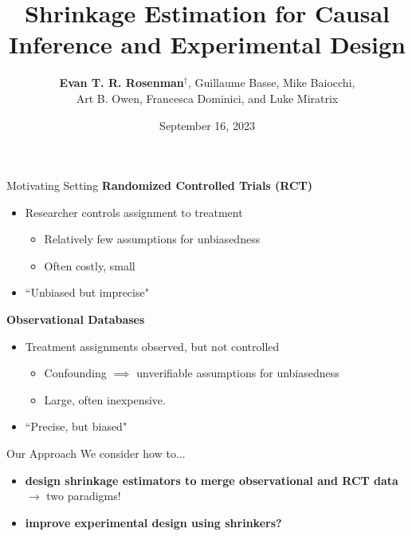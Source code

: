 \documentclass[usenames,dvipsnames]{beamer}
\title{Shrinkage Estimation for Causal Inference and Experimental Design}	%
\author{\textbf{Evan T. R. Rosenman}$^{\dag}$, Guillaume Basse, Mike Baiocchi,\\ Art B. Owen, Francesca Dominici, and Luke Miratrix}								%
\institute{$^{\dag}$ Assistant Professor, Claremont McKenna College}					%
\date{September 16, 2023}									%
\let\oldcitep=\citep
\renewcommand{\citep}[1]{\textcolor[rgb]{.3,.3,.8}{\oldcitep{#1}}}
\theoremstyle{definition} %
\begin{document}
\begin{frame}
  \titlepage
\end{frame}

%


\begin{frame}{Motivating Setting}
\textbf{Randomized Controlled Trials (RCT)}
\begin{itemize}
\item Researcher controls assignment to treatment
\begin{itemize}
\item Relatively few assumptions for unbiasedness
\item Often costly, small
\end{itemize}
\item``Unbiased but imprecise" 
\end{itemize}

\textbf{Observational Databases}
\begin{itemize}
\item Treatment assignments observed, but not controlled 
\begin{itemize}
\item  Confounding $\implies$ unverifiable assumptions for unbiasedness
\item Large, often inexpensive.
\end{itemize}
\item ``Precise, but biased" 
\end{itemize}
\end{frame}

\begin{frame}{Our Approach}
We consider how to...
\begin{itemize} 
\item \textbf{design shrinkage estimators to merge observational and RCT data } $\rightarrow$ two paradigms!
\item \textbf{improve experimental design using shrinkers?}
\end{itemize}
\end{frame}
\end{document}
